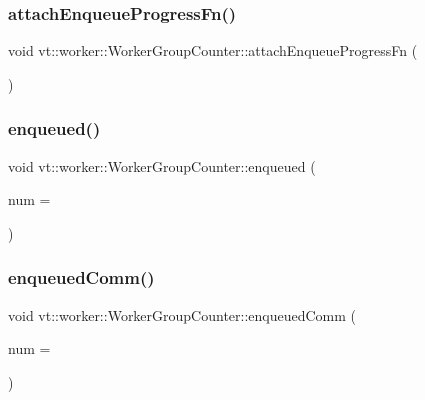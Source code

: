 \subsubsection{\texorpdfstring{attach\+Enqueue\+Progress\+Fn()}{attachEnqueueProgressFn()}}
{\footnotesize\ttfamily void vt\+::worker\+::\+Worker\+Group\+Counter\+::attach\+Enqueue\+Progress\+Fn (\begin{DoxyParamCaption}{ }\end{DoxyParamCaption})\hspace{0.3cm}{\ttfamily [protected]}}

\mbox{\label{structvt_1_1worker_1_1_worker_group_counter_adbcab001bd3585539767059478456fa2}} 
\subsubsection{\texorpdfstring{enqueued()}{enqueued()}}
{\footnotesize\ttfamily void vt\+::worker\+::\+Worker\+Group\+Counter\+::enqueued (\begin{DoxyParamCaption}\item[{\hyperlink{namespacevt_1_1worker_a8080c49350b0520151601a8b24d6c6cf}{Work\+Unit\+Count\+Type}}]{num = {} }\end{DoxyParamCaption})}

\mbox{\label{structvt_1_1worker_1_1_worker_group_counter_af638994494fff8661d7cef5008014ab8}} 
\subsubsection{\texorpdfstring{enqueued\+Comm()}{enqueuedComm()}}
{\footnotesize\ttfamily void vt\+::worker\+::\+Worker\+Group\+Counter\+::enqueued\+Comm (\begin{DoxyParamCaption}\item[{\hyperlink{namespacevt_1_1worker_a8080c49350b0520151601a8b24d6c6cf}{Work\+Unit\+Count\+Type}}]{num = {} }\end{DoxyParamCaption})}

